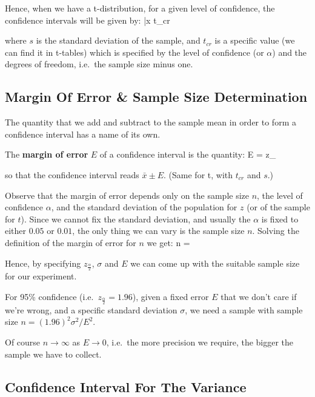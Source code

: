 Hence, when we have a t-distribution, for a given level of confidence, the confidence intervals will be given by:
\bse
\bar{x} \pm t_{cr} 
\ese

where $s$ is the standard deviation of the sample, and $t_{cr}$ is a specific value (we can find it in t-tables)
which is specified by the level of confidence (or $\alpha$) and the degrees of freedom, i.e.\ the sample size minus
one.

\subsection{Margin Of Error \& Sample Size Determination}

The quantity that we add and subtract to the sample mean in order to form a confidence interval has a name of its
own.

The \textbf{margin of error} $E$ of a confidence interval is the quantity:
\bse
E = z_{} 
\ese

so that the confidence interval reads $\bar{x} \pm E$. (Same for t, with $t_{cr}$ and $s$.)
\ed

Observe that the margin of error depends only on the sample size $n$, the level of confidence $\alpha$, and the
standard deviation of the population for $z$ (or of the sample for $t$). Since we cannot fix the standard
deviation, and usually the $\alpha$ is fixed to either $0.05$ or $0.01$, the only thing we can vary is the sample
size $n$. Solving the definition of the margin of error for $n$ we get:
\bse
n = 
\ese

Hence, by specifying $z_{\frac{\alpha}{2}}$, $\sigma$ and $E$ we can come up with the suitable sample size for our
experiment.

\be
For 95\% confidence (i.e.\ $z_{\frac{\alpha}{2}} = 1.96$), given a fixed error $E$ that we don't care if we're
wrong, and a specific standard deviation $\sigma$, we need a sample with sample size $n = (1.96)^{2} \sigma^{2} /
E^{2}$.
\ee

Of course $n \to \infty$ as $E \to 0$, i.e.\ the more precision we require, the bigger the sample we have to collect.

\subsection{Confidence Interval For The Variance}

